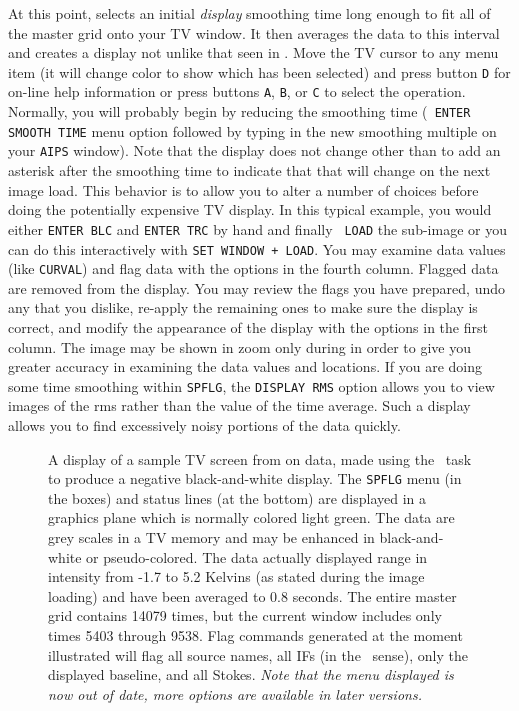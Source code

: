      At this point, {\tt {}} selects an initial {\it
display\/} smoothing time long enough to fit all of the master grid
onto your TV window.  It then averages the data to this interval and
creates a display not unlike that seen in .  Move the
TV cursor to any menu item (it will change color to show which has
been selected) and press button {\tt D} for on-line help information
or press buttons {\tt A}, {\tt B}, or {\tt C} to select the operation.
Normally, you will probably begin by reducing the smoothing time ({\tt
ENTER SMOOTH TIME} menu option followed by typing in the new smoothing
multiple on your {\tt AIPS} window).  Note that the display does not
change other than to add an asterisk after the smoothing time to
indicate that that will change on the next image load.  This behavior
is to allow you to alter a number of choices before doing the
potentially expensive TV display.  In this typical example, you would
either {\tt ENTER BLC} and {\tt ENTER TRC} by hand and finally {\tt
LOAD} the sub-image or you can do this interactively with {\tt SET
WINDOW + \hbox{LOAD}}. You may examine data values (like {\tt CURVAL})
and flag data with the options in the fourth column.  Flagged data are
removed from the display.  You may review the flags you have prepared,
undo any that you dislike, re-apply the remaining ones to make sure
the display is correct, and modify the appearance of the display with
the options in the first column.  The image may be shown in zoom only
during  in order to give you greater accuracy in
examining the data values and locations.  If you are doing some time
smoothing within {\tt SPFLG}, the {\tt DISPLAY RMS} option allows you
to view images of the rms rather than the value of the time average.
Such a display allows you to find excessively noisy portions of the
data quickly.

\begin{figure}
\centering
\caption[{\tt SPFLG} display.]{A display of a sample TV screen from
{\tt {}} on  data, made using the \AIPS\
task {\tt {}} to produce a negative black-and-white display.
The {\tt SPFLG} menu (in the boxes) and status lines (at the bottom)
are displayed in a graphics plane which is normally colored light
green. The data are grey scales in a TV memory and may be enhanced in
black-and-white or pseudo-colored.  The data actually displayed range
in intensity from -1.7 to 5.2 Kelvins (as stated during the image
loading) and have been averaged to 0.8 seconds.  The entire master
grid contains 14079 times, but the current window includes only times
5403 through 9538. Flag commands generated at the moment illustrated
will flag all source names, all IFs (in the \AIPS\ sense), only the
displayed baseline, and all Stokes.  {\it Note that the menu displayed
is now out of date, more options are available in later
versions.}
}
\label{fig:spflg}
\end{figure}


